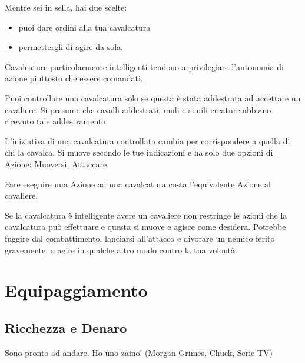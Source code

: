 \documentclass[12pt,a4paper,twoside,openany]{book}
\begin{document}
\begin{multicols}{2}
Mentre sei in sella, hai due scelte:

\begin{itemize}
\item puoi dare ordini alla tua cavalcatura
\item permettergli di agire da sola.
\end{itemize}

Cavalcature particolarmente intelligenti tendono a privilegiare l'autonomia di azione piuttosto che essere comandati.

Puoi controllare una cavalcatura solo se questa è stata addestrata ad accettare un cavaliere. Si presume che cavalli addestrati, muli e simili creature abbiano ricevuto tale addestramento.

L'iniziativa di una cavalcatura controllata cambia per corrispondere a quella di chi la cavalca. Si muove secondo le tue indicazioni e ha solo due opzioni di Azione: Muoversi, Attaccare.

Fare eseguire una Azione ad una cavalcatura costa l'equivalente Azione al cavaliere.

Se la cavalcatura è intelligente avere un cavaliere non restringe le azioni che la cavalcatura può effettuare e questa si muove e agisce come desidera. Potrebbe fuggire dal combattimento, lanciarsi all'attacco e divorare un nemico ferito gravemente, o agire in qualche altro modo contro la tua volontà.

\end{multicols}


\pagebreak

\section{Equipaggiamento}\hypertarget{equipaggiamento}{}\label{equipaggiamento}

\subsection{Ricchezza e Denaro}
\begin{changemargin}{0.3cm}{0.3cm}\begin{enfasi}{Sono pronto ad andare. Ho uno zaino! (Morgan Grimes, Chuck, Serie TV)
}\end{enfasi}\end{changemargin}
\end{document}
